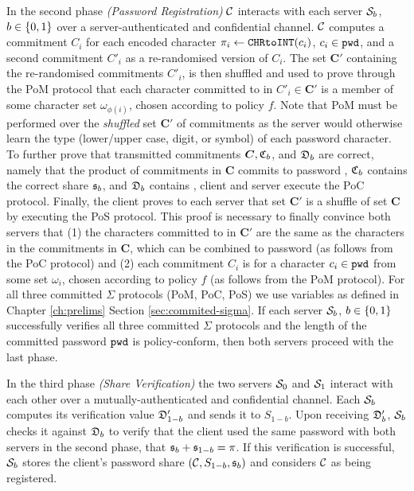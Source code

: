 In the second phase \emph{(Password Registration)} $\mathcal{C}$ interacts with each server $\mathcal{S}_b$, $b\in\{0,1\}$ over a server-authenticated and confidential channel. $\mathcal{C}$ computes a commitment $C_i$ for each encoded character $\pi_i\gets\texttt{CHRtoINT}(c_i)$, $c_i\in\mathtt{pwd}$, and a second commitment $C'_i$ as a re-randomised version of $C_i$.
The set $\bm C'$ containing the re-randomised commitments $C'_i$, is then shuffled and used to prove through the \acl{PoM} protocol that each character committed to in $C'_i\in\bm C'$ is a member of some character set $\omega_{\phi(i)}$, chosen according to policy $f$.
Note that \ac{PoM} must be performed over the \emph{shuffled} set $\bm C'$ of commitments as the server would otherwise learn the type (lower/upper case, digit, or symbol) of each password character.
To further prove that transmitted commitments ${\bm C}, \mathfrak{C}_b$, and $\mathfrak{D}_b$ are correct, namely that the product of commitments in $\bm C$ commits to password \pwd, $\mathfrak{C}_b$ contains the correct share $\mathfrak{s}_b$, and $\mathfrak{D}_b$ contains \pwd, client and server execute the \acl{PoC} protocol. 
Finally, the client proves to each server that set $\bm C'$ is a shuffle of set $\bm C$ by executing the \acl{PoS} protocol. 
This proof is necessary to finally convince both servers that 
(1) the characters committed to in $\bm C'$ are the same as the characters in the commitments in $\bm C$, which can be combined to password \pwd (as follows from the \ac{PoC} protocol) and 
(2) each commitment $C_i$ is for a character $c_i\in\mathtt{pwd}$ from some set $\omega_{i}$, chosen according to policy $f$ (as follows from the \ac{PoM} protocol).  
For all three committed $\Sigma$ protocols (\ac{PoM}, \ac{PoC}, \ac{PoS}) we use variables as defined in Chapter \ref{ch:prelims} Section \ref{sec:commited-sigma}.
If each server $\mathcal{S}_b$, $b\in\{0,1\}$ successfully verifies all three committed $\Sigma$ protocols and the length of the committed password $\mathtt{pwd}$ is policy-conform, then both servers proceed with the last phase. 

In the third phase \emph{(Share Verification)} the two servers $\mathcal{S}_0$ and $\mathcal{S}_1$ interact with each other over a mutually-authenticated and confidential channel. Each $\mathcal{S}_b$ computes its verification value $\mathfrak{D}'_{1-b}$ and sends it to $S_{1-b}$.
Upon receiving $\mathfrak{D}'_{b}$, $\mathcal{S}_b$ checks it against $\mathfrak{D}_b$ to verify that the client used the same password with both servers in the second phase, \ie that $\mathfrak{s}_b+\mathfrak{s}_{1-b}=\pi$.
If this verification is successful, $\mathcal{S}_b$ stores the client's password share $(\mathcal{C},S_{1-b},\mathfrak{s}_b)$ and considers $\mathcal{C}$ as being registered.

